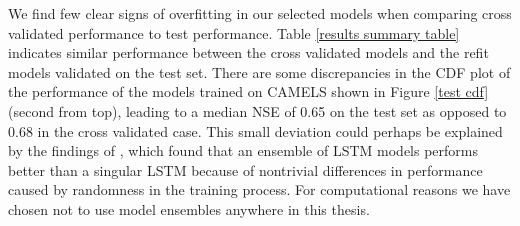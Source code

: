 We find few clear signs of overfitting in our selected models when comparing 
cross validated performance to test performance. Table 
\ref{results summary table} indicates 
similar performance between the cross validated models and the refit models 
validated on the test set. There are some discrepancies in the CDF plot of 
the performance of the models trained on CAMELS 
shown in Figure \ref{test cdf} (second from top), leading to a median NSE of 
0.65 on the test set as opposed to $0.68$ in the cross validated case. This small 
deviation could perhaps be explained by the findings of \citet{lstm_second_paper},
 which found that an ensemble of LSTM models performs better than a singular LSTM 
 because of nontrivial differences in performance caused by randomness in the 
 training process. For computational reasons we have chosen not to use model 
 ensembles anywhere in this thesis.

